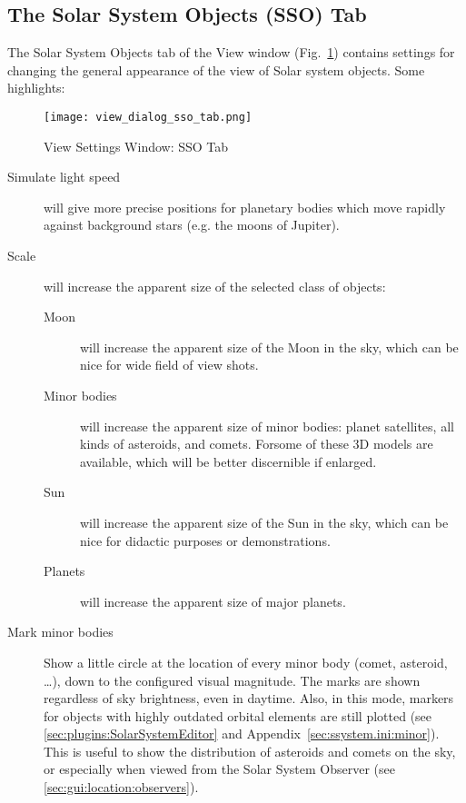 \subsection{The Solar System Objects (SSO) Tab}
\label{sec:gui:view:sso}

The Solar System Objects tab of the View window (Fig.~\ref{fig:gui:view:sso}) contains settings
for changing the general appearance of the view of Solar system objects. Some highlights:

\begin{figure}[htbp]
\centering\texttt{[image: view\_dialog\_sso\_tab.png]}
\caption{View Settings Window: SSO Tab}
\label{fig:gui:view:sso}
\end{figure}


\begin{description}
\item[Simulate light speed] will give more precise positions for planetary bodies which move
  rapidly against background stars (e.g. the moons of Jupiter).
\item[Scale] will increase the apparent size of the selected class of objects:
  \begin{description}
  \item[Moon] will increase the apparent size of the Moon
  in the sky, which can be nice for wide field of view shots.
  \item[Minor bodies] will increase the apparent size of minor
  bodies: planet satellites, all kinds of asteroids, and comets.  
  Forsome of these 3D models are available, which will be better
  discernible if enlarged.
  \item[Sun] will increase the apparent size of the Sun
    in the sky, which can be nice for didactic purposes or demonstrations.
  \item[Planets] will increase the apparent size of major planets.
  \end{description}
\item[Mark minor bodies] Show a little circle at the location of every minor body (comet,
  asteroid, \ldots), down to the configured visual magnitude.
  The marks are shown regardless of sky brightness, even in daytime. Also, in this mode, markers for objects 
  with highly outdated orbital elements are still plotted (see \ref{sec:plugins:SolarSystemEditor} 
  and Appendix~\ref{sec:ssystem.ini:minor}). 
  This is useful to show the distribution of asteroids and comets on the sky, 
  or especially when viewed from the Solar System Observer (see \ref{sec:gui:location:observers}). 


\end{description}

